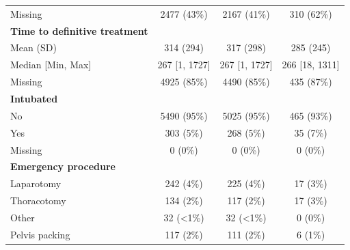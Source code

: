 \documentclass[12pt, a4paper]{article}
\begin{document}
\begin{appendices}
\begin{table}[t!]
{\begin{tabular}{lccc}
                \hspace{3mm}Missing                           & 2477 (43\%)       & 2167 (41\%)       & 310 (62\%)       \\
                \textbf{Time to definitive treatment}         &                   &                   &                  \\
                \hspace{3mm}Mean (SD)                         & 314 (294)         & 317 (298)         & 285 (245)        \\
                \hspace{3mm}Median [Min, Max]                 & 267 [1, 1727]     & 267 [1, 1727]     & 266 [18, 1311]   \\
                \hspace{3mm}Missing                           & 4925 (85\%)       & 4490 (85\%)       & 435 (87\%)       \\
                \textbf{Intubated}                            &                   &                   &                  \\
                \hspace{3mm}No                                & 5490 (95\%)       & 5025 (95\%)       & 465 (93\%)       \\
                \hspace{3mm}Yes                               & 303 (5\%)         & 268 (5\%)         & 35 (7\%)         \\
                \hspace{3mm}Missing                           & 0 (0\%)           & 0 (0\%)           & 0 (0\%)          \\
                \textbf{Emergency procedure}                  &                   &                   &                  \\
                \hspace{3mm}Laparotomy                        & 242 (4\%)         & 225 (4\%)         & 17 (3\%)         \\
                \hspace{3mm}Thoracotomy                       & 134 (2\%)         & 117 (2\%)         & 17 (3\%)         \\
                \hspace{3mm}Other                             & 32 (\textless1\%) & 32 (\textless1\%) & 0 (0\%)          \\
                \hspace{3mm}Pelvis packing                    & 117 (2\%)         & 111 (2\%)         & 6 (1\%)          \\

\end{tabular}}
\end{table}
\end{appendices}
\end{document}
